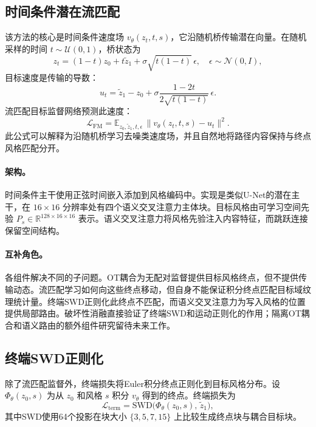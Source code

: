\documentclass[letterpaper]{article}
\begin{document}
\subsection{时间条件潜在流匹配}
该方法的核心是时间条件速度场 $v_\theta(z_t,t,s)$，它沿随机桥传输潜在向量。在随机采样的时间 $t\sim\mathcal{U}(0,1)$，桥状态为
\begin{equation}
    z_t = (1-t)z_0 + t\tilde{z}_1 + \sigma\sqrt{t(1-t)}\,\epsilon,
    \quad \epsilon\sim\mathcal{N}(0,I),
\end{equation}
目标速度是传输的导数：
\begin{equation}
    u_t = \tilde{z}_1 - z_0 + \sigma\frac{1-2t}{2\sqrt{t(1-t)}}\,\epsilon .
\end{equation}
流匹配目标监督网络预测此速度：
\begin{equation}
    \mathcal{L}_{\mathrm{FM}} = \mathbb{E}_{z_0,\tilde{z}_1,t,\epsilon}\,
    \bigl\|v_\theta(z_t,t,s) - u_t\bigr\|^2 .
\end{equation}
此公式可以解释为沿随机桥学习去噪类速度场，并且自然地将路径内容保持与终点风格匹配分开。

\paragraph{架构。}
时间条件主干使用正弦时间嵌入添加到风格编码中。实现是类似U-Net的潜在主干，在 $16\times16$ 分辨率处有四个语义交叉注意力主体块。目标风格由可学习空间先验 $P_s\in\mathbb{R}^{128\times16\times16}$ 表示。语义交叉注意力将风格先验注入内容特征，而跳跃连接保留空间结构。

\paragraph{互补角色。}
各组件解决不同的子问题。OT耦合为无配对监督提供目标风格终点，但不提供传输动态。流匹配学习如何向这些终点移动，但自身不能保证积分终点匹配目标域纹理统计量。终端SWD正则化此终点不匹配，而语义交叉注意力为写入风格的位置提供局部路由。破坏性消融直接验证了终端SWD和运动正则化的作用；隔离OT耦合和语义路由的额外组件研究留待未来工作。

\subsection{终端SWD正则化}
除了流匹配监督外，终端损失将Euler积分终点正则化到目标风格分布。设 $\Phi_\theta(z_0,s)$ 为从 $z_0$ 和风格 $s$ 积分 $v_\theta$ 得到的终点。终端损失为
\begin{equation}
    \mathcal{L}_{\mathrm{term}} = \mathrm{SWD}\bigl(\Phi_\theta(z_0,s),\,\tilde{z}_1\bigr),
\end{equation}
其中SWD使用64个投影在块大小 $\{3,5,7,15\}$ 上比较生成终点块与耦合目标块。
\end{document}
